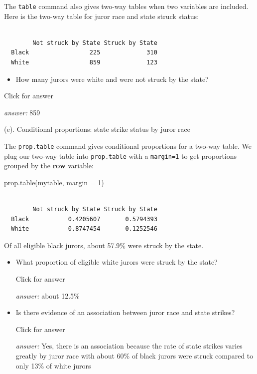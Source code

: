 \documentclass[
]{book}
\newenvironment{Shaded}{\begin{snugshade}}{\end{snugshade}}
\newcommand{\AttributeTok}[1]{\textcolor[rgb]{0.77,0.63,0.00}{#1}}
\newcommand{\DecValTok}[1]{\textcolor[rgb]{0.00,0.00,0.81}{#1}}
\newcommand{\FunctionTok}[1]{\textcolor[rgb]{0.00,0.00,0.00}{#1}}
\newcommand{\NormalTok}[1]{#1}
\newcommand{\OtherTok}[1]{\textcolor[rgb]{0.56,0.35,0.01}{#1}}
\newcommand{\SpecialCharTok}[1]{\textcolor[rgb]{0.00,0.00,0.00}{#1}}
\providecommand{\tightlist}{%
  \setlength{\itemsep}{0pt}\setlength{\parskip}{0pt}}
\begin{document}
The \texttt{table} command also gives two-way tables when two variables are included. Here is the two-way table for juror race and state struck status:

\begin{Shaded}
\end{Shaded}

\begin{verbatim}
       
        Not struck by State Struck by State
  Black                 225             310
  White                 859             123
\end{verbatim}

\begin{itemize}
\tightlist
\item
  How many jurors were white and were not struck by the state?
\end{itemize}

Click for answer

\emph{answer:} 859

(e). Conditional proportions: state strike status by juror race

The \texttt{prop.table} command gives conditional proportions for a two-way table. We plug our two-way table into \texttt{prop.table} with a \texttt{margin=1} to get proportions grouped by the \textbf{row} variable:

\begin{Shaded}
\begin{Highlighting}[]
\FunctionTok{prop.table}\NormalTok{(mytable, }\AttributeTok{margin =} \DecValTok{1}\NormalTok{)}
\end{Highlighting}
\end{Shaded}

\begin{verbatim}
       
        Not struck by State Struck by State
  Black           0.4205607       0.5794393
  White           0.8747454       0.1252546
\end{verbatim}

Of all eligible black jurors, about 57.9\% were struck by the state.

\begin{itemize}
\tightlist
\item
  What proportion of eligible white jurors were struck by the state?

  Click for answer

  \emph{answer:} about 12.5\%
\item
  Is there evidence of an association between juror race and state strikes?

  Click for answer

  \emph{answer:} Yes, there is an association because the rate of state strikes varies greatly by juror race with
  about 60\% of black jurors were struck compared to only 13\% of white jurors
\end{itemize}
\end{document}

